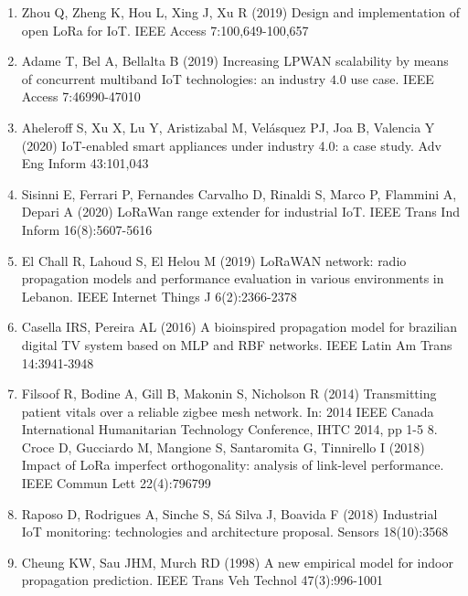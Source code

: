 \documentclass[10pt]{ctexart}
\begin{document}
\begin{enumerate}
  \item Zhou Q, Zheng K, Hou L, Xing J, Xu R (2019) Design and implementation of open LoRa for IoT. IEEE Access 7:100,649-100,657

  \item Adame T, Bel A, Bellalta B (2019) Increasing LPWAN scalability by means of concurrent multiband IoT technologies: an industry $4.0$ use case. IEEE Access 7:46990-47010

  \item Aheleroff S, Xu X, Lu Y, Aristizabal M, Velásquez PJ, Joa B, Valencia Y (2020) IoT-enabled smart appliances under industry 4.0: a case study. Adv Eng Inform 43:101,043

  \item Sisinni E, Ferrari P, Fernandes Carvalho D, Rinaldi S, Marco P, Flammini A, Depari A (2020) LoRaWan range extender for industrial IoT. IEEE Trans Ind Inform 16(8):5607-5616

  \item El Chall R, Lahoud S, El Helou M (2019) LoRaWAN network: radio propagation models and performance evaluation in various environments in Lebanon. IEEE Internet Things J 6(2):2366-2378

  \item Casella IRS, Pereira AL (2016) A bioinspired propagation model for brazilian digital TV system based on MLP and RBF networks. IEEE Latin Am Trans 14:3941-3948

  \item Filsoof R, Bodine A, Gill B, Makonin S, Nicholson R (2014) Transmitting patient vitals over a reliable zigbee mesh network. In: 2014 IEEE Canada International Humanitarian Technology Conference, IHTC 2014, pp 1-5 8. Croce D, Gucciardo M, Mangione S, Santaromita G, Tinnirello I (2018) Impact of LoRa imperfect orthogonality: analysis of link-level performance. IEEE Commun Lett 22(4):796799

  \item Raposo D, Rodrigues A, Sinche S, Sá Silva J, Boavida F (2018) Industrial IoT monitoring: technologies and architecture proposal. Sensors 18(10):3568

  \item Cheung KW, Sau JHM, Murch RD (1998) A new empirical model for indoor propagation prediction. IEEE Trans Veh Technol 47(3):996-1001
\end{enumerate}
\end{document}
